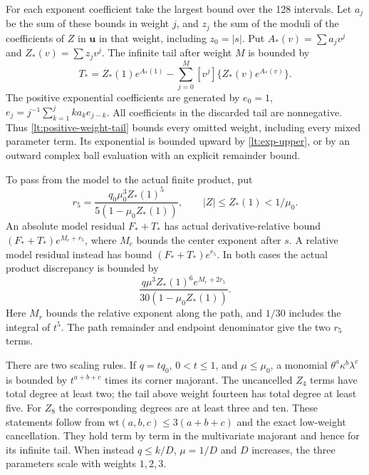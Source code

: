\documentclass[11pt,reqno]{amsart}
\numberwithin{equation}{section}
\theoremstyle{definition}
\theoremstyle{remark}
\begin{document}
For each exponent coefficient take the largest bound over the 128
intervals. Let $a_j$ be the sum of these bounds in weight $j$,
and $z_j$ the sum of the moduli of the coefficients of $Z$ in
$\mathbf u$ in that weight, including $z_0=|s|$. Put
$A_* (v)=\sum a_jv^j$ and $Z_*(v)=\sum z_jv^j$. The infinite tail
after weight $M$ is bounded by
\begin{equation}\label{lt:positive-weight-tail}
 T_*=Z_*(1)e^{A_*(1)}-
          \sum_{j=0}^M[v^j]\{Z_*(v)e^{A_*(v)}\}.
\end{equation}
The positive exponential coefficients are generated by
$e_0=1$, $e_j=j^{-1}\sum_{k=1}^jka_ke_{j-k}$.
All coefficients in the discarded tail are nonnegative. Thus
\eqref{lt:positive-weight-tail} bounds every omitted weight, including
every mixed parameter term. Its exponential is bounded upward by
\eqref{lt:exp-upper}, or by an outward complex ball evaluation with
an explicit remainder bound.

To pass from the model to the actual finite product, put
\[
 r_5=\frac{q_0\mu_0^3Z_*(1)^5}{5(1-\mu_0Z_*(1))},
       \qquad |Z|\le Z_*(1)<1/\mu_0.
\]
An absolute model residual $F_*+T_*$ has actual derivative-relative
bound $(F_*+T_*)e^{M_c+r_5}$, where $M_c$ bounds the center exponent
after $s$. A relative model residual instead has bound
$(F_*+T_*)e^{r_5}$. In both cases the actual product discrepancy is
bounded by
\begin{equation}\label{lt:four-actual-tail}
 \frac{q\mu^3Z_*(1)^6e^{M_r+2r_5}}{30(1-\mu_0Z_*(1))}.
\end{equation}
Here $M_r$ bounds the relative exponent along the path, and $1/30$
includes the integral of $t^5$. The path remainder and endpoint
denominator give the two $r_5$ terms.

There are two scaling rules. If $q=tq_0$, $0<t\le1$, and
$\mu\le\mu_0$, a monomial $\theta^a\kappa^b\lambda^c$ is bounded by
$t^{a+b+c}$ times its corner majorant. The uncancelled $Z_4$ terms
have total degree at least two; the tail above weight fourteen has
total degree at least five.
For $Z_8$ the corresponding degrees are at least three and ten.
These statements follow from $\mathrm{wt}(a,b,c)\le3(a+b+c)$
and the exact low-weight cancellation. They hold term by term in the
multivariate majorant and hence for its infinite tail. When instead
$q\le k/D$, $\mu=1/D$ and $D$ increases, the three parameters
scale with weights $1,2,3$.
\end{document}
